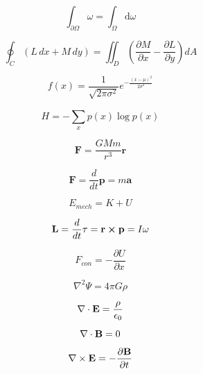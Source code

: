 \documentclass{article}
\begin{document}
\begin{equation}
    \int_{\partial \Omega} \omega = \int_\Omega \mathrm{d} \omega
\end{equation}

\begin{equation}
    \oint_C (L\, dx + M\, dy) = \iint_{D} \left(\frac{\partial M}{\partial x} - \frac{\partial L}{\partial y}\right) dA
\end{equation}

\begin{equation}
    f(x) = \frac{1}{\sqrt{2\pi\sigma^2}}e^{-\frac{(x-\mu)^2}{2\sigma^2}}
\end{equation}

\begin{equation}
    H = -\sum_{x}^{}p(x)\log p(x)
\end{equation}

\begin{equation}
    \mathbf{F} = \frac{GMm}{r^3}\mathbf{r}
\end{equation}

\begin{equation}
    \mathbf{F} =\frac{d}{dt}\mathbf{p} = m\mathbf{a}
\end{equation}

\begin{equation}
    E_{mech} = K + U
\end{equation}

\begin{equation}
    \mathbf{L} = \frac{d}{dt}\mathrm{\mathbf{\tau}} = \mathbf{r} \cross \mathbf{p} = I\omega
\end{equation}

\begin{equation}
    F_{con} = -\frac{\partial U}{\partial x}
\end{equation}

\begin{equation}
    \nabla^2 \Psi = 4\pi G\rho
\end{equation}

\begin{equation}
    \nabla \cdot \mathbf{E} = \frac{\rho}{\epsilon_0}\\
\end{equation}

\begin{equation}
    \nabla \cdot \mathbf{B} = 0\\
\end{equation}

\begin{equation}
    \nabla \times \mathbf{E} = -\pdv{\mathbf{B}}{t}\\
\end{equation}
\end{document}
